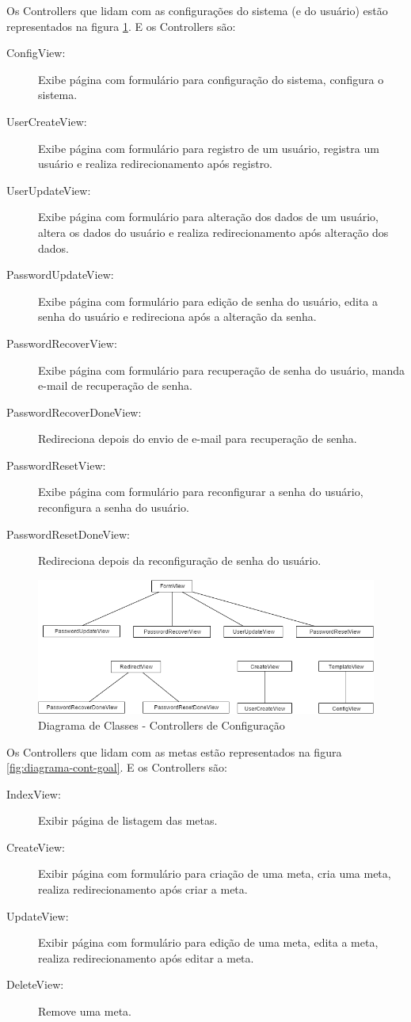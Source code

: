 Os Controllers que lidam com as configurações do sistema (e do usuário) estão representados na figura \ref{fig:diagrama-cont-configuration}. E os Controllers são:
\begin{description}
	\item[ConfigView:] Exibe página com formulário para configuração do sistema, configura o sistema.
	\item[UserCreateView:] Exibe página com formulário para registro de um usuário, registra um usuário e realiza redirecionamento após registro.
	\item[UserUpdateView:] Exibe página com formulário para alteração dos dados de um usuário, altera os dados do usuário e realiza redirecionamento após alteração dos dados.
	\item[PasswordUpdateView:] Exibe página com formulário para edição de senha do usuário, edita a senha do usuário e redireciona após a alteração da senha.
	\item[PasswordRecoverView:] Exibe página com formulário para recuperação de senha do usuário, manda e-mail de recuperação de senha.
	\item[PasswordRecoverDoneView:] Redireciona depois do envio de e-mail para recuperação de senha.
	\item[PasswordResetView:] Exibe página com formulário para reconfigurar a senha do usuário, reconfigura a senha do usuário.
	\item[PasswordResetDoneView:] Redireciona depois da reconfiguração de senha do usuário.
\end{description} 

\begin{figure}
\centering
\includegraphics[width=16cm,keepaspectratio]{figuras/diagrama_cont_configuration.png}
\caption{\label{fig:diagrama-cont-configuration} Diagrama de Classes - Controllers de Configuração}
\end{figure}

Os Controllers que lidam com as metas estão representados na figura \ref{fig:diagrama-cont-goal}. E os Controllers são:
\begin{description}
	\item[IndexView:] Exibir página de listagem das metas.
	\item[CreateView:] Exibir página com formulário para criação de uma meta, cria uma meta, realiza redirecionamento após criar a meta.
	\item[UpdateView:] Exibir página com formulário para edição de uma meta, edita a meta, realiza redirecionamento após editar a meta.
	\item[DeleteView:] Remove uma meta.
\end{description} 

